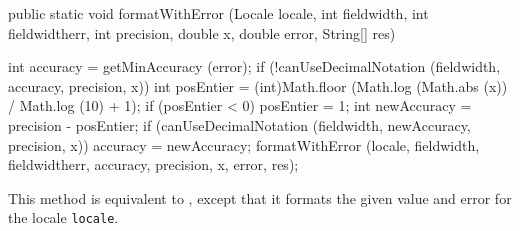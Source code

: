 \begin{code}

   public static void formatWithError (Locale locale, int fieldwidth,
          int fieldwidtherr, int precision, double x, double error,
          String[] res)\begin{hide} {
      int accuracy = getMinAccuracy (error);
      if (!canUseDecimalNotation (fieldwidth, accuracy, precision, x)) {
         int posEntier = (int)Math.floor (Math.log (Math.abs (x)) / Math.log (10) + 1);
         if (posEntier < 0)
            posEntier = 1;
         int newAccuracy = precision - posEntier;
         if (canUseDecimalNotation (fieldwidth, newAccuracy, precision, x))
            accuracy = newAccuracy;
      }
      formatWithError (locale, fieldwidth, fieldwidtherr, accuracy, precision, x, error, res);
   }\end{hide}
\end{code}
\begin{tabb}
  This method is equivalent to
  ,
  except that it formats the given value and error for the
  locale \texttt{locale}.
\end{tabb}
\begin{htmlonly}
\end{htmlonly}
%
\begin{code}\begin{hide}
}\end{hide}
\end{code}
